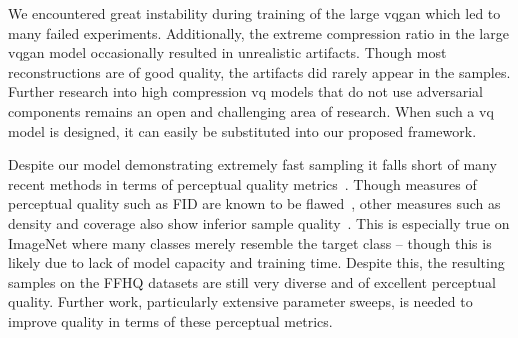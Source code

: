 We encountered great instability during training of the large \gls{vqgan} which
led to many failed experiments. Additionally, the extreme compression ratio in
the large \gls{vqgan} model occasionally resulted in unrealistic artifacts. Though
most reconstructions are of good quality, the artifacts did rarely appear in the
samples. Further research into high compression \gls{vq} models that do not use
adversarial components remains an open and challenging area of research. When
such a \gls{vq} model is designed, it can easily be substituted into our
proposed framework.

Despite our model demonstrating extremely fast sampling it falls short of many
recent methods in terms of perceptual quality
metrics~\cite{bondtaylor2021unleashing}. Though measures of perceptual quality
such as FID are known to be flawed~\cite{chong2020effectively}, other measures
such as density and coverage also show inferior sample
quality~\cite{ferjad2020icml}. This is especially true on ImageNet where many
classes merely resemble the target class -- though this is likely due to lack of
model capacity and training time. Despite this, the resulting samples on the
FFHQ datasets are still very diverse and of excellent perceptual quality.
Further work, particularly extensive parameter sweeps, is needed to improve
quality in terms of these perceptual metrics.
